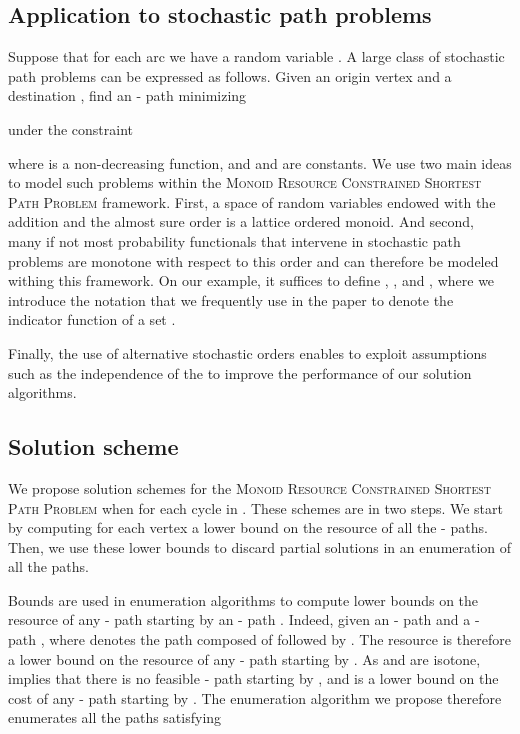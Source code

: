 \documentclass[11pt]{amsart}
\theoremstyle{plain}
\theoremstyle{remark}
\newcommand{\MRCSP}{\textsc{Monoid Resource Constrained Shortest Path Problem}\xspace}
\begin{document}
\subsection{Application to stochastic path problems} \label{sub:application_to_stochastic_path_problem}

Suppose that for each arc  we have a random variable . A large class of stochastic path problems can be expressed as follows. Given an origin vertex  and a destination , find an - path minimizing

\noindent under the constraint

\noindent where  is a non-decreasing function, and  and  are constants. We use two main ideas to model such problems within the \MRCSP framework. First, a space of random variables endowed with the addition and the almost sure order is a lattice ordered monoid. And second, many if not most probability functionals that intervene in stochastic path problems are monotone with respect to this order and can therefore be modeled withing this framework. On our example, it suffices to define , , and , where we introduce the notation  that we frequently use in the paper to denote the indicator function of a set .

 Finally, the use of alternative stochastic orders enables to exploit assumptions such as the independence of the  to improve the performance of our solution algorithms. 

\subsection{Solution scheme} \label{sub:solution_scheme}


We propose solution schemes for the \MRCSP when  for each cycle  in . These schemes are in two steps. We start by computing for each vertex  a lower bound  on the resource  of all the - paths. Then, we use these lower bounds to discard partial solutions in an enumeration of all the paths. 

Bounds  are used in enumeration algorithms to compute lower bounds on the resource of any - path starting by an - path . Indeed, given an - path  and a - path ,  
where  denotes the path composed of  followed by . The resource  is therefore a lower bound on the resource of any - path starting by . As  and  are isotone,  implies that there is no feasible - path starting by , and  is a lower bound on the cost of any - path  starting by . The enumeration algorithm we propose therefore enumerates all the paths satisfying
\end{document}
